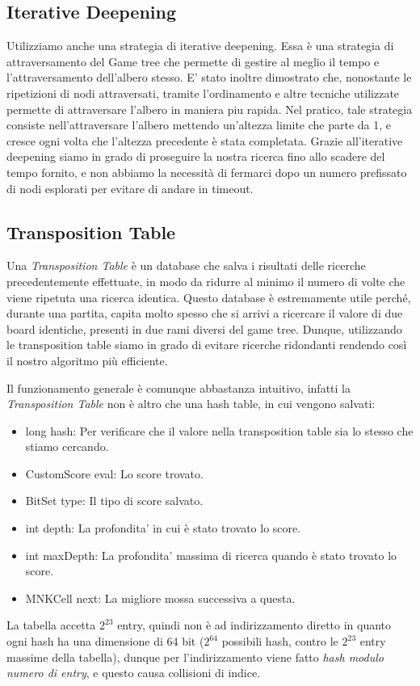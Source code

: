 \documentclass{article}
\begin{document}
\subsection{Iterative Deepening}
Utilizziamo anche una strategia di iterative deepening. Essa è una strategia di attraversamento del Game tree che permette di gestire al meglio il tempo e l'attraversamento dell'albero stesso. E' stato inoltre dimostrato che, nonostante le ripetizioni di nodi attraversati, tramite l'ordinamento e altre tecniche utilizzate permette di attraversare l'albero in maniera piu rapida. Nel pratico, tale strategia consiste nell'attraversare l'albero mettendo un'altezza limite che parte da 1, e cresce ogni volta che l'altezza precedente è stata completata. Grazie all'iterative deepening siamo in grado di proseguire la nostra ricerca fino allo scadere del tempo fornito, e non abbiamo la necessità di fermarci dopo un numero prefissato di nodi esplorati per evitare di andare in timeout.
\subsection{Transposition Table}
Una \textit{Transposition Table} è un database che salva i risultati delle ricerche precedentemente effettuate, in modo da ridurre al minimo il numero di volte che viene ripetuta una ricerca identica. Questo database è estremamente utile perché, durante una partita, capita molto spesso che si arrivi a ricercare il valore di due board identiche, presenti in due rami diversi del game tree. Dunque, utilizzando le transposition table siamo in grado di evitare ricerche ridondanti rendendo così il nostro algoritmo più efficiente.

Il funzionamento generale è comunque abbastanza intuitivo, infatti la \textit{Transposition Table} non è altro che una hash table, in cui vengono salvati: 
\begin{itemize}
\item long hash: Per verificare che il valore nella transposition table sia lo stesso che stiamo cercando.
\item CustomScore   eval:       Lo score trovato.
\item BitSet        type:       Il tipo di score salvato.
\item int           depth:      La profondita' in cui è stato trovato lo score.
\item int           maxDepth:   La profondita' massima di ricerca quando è stato trovato lo score.
\item MNKCell       next:       La migliore mossa successiva a questa.
\end{itemize}
La tabella accetta $2^{23}$ entry, quindi non è ad indirizzamento diretto in quanto ogni hash ha una dimensione di 64 bit ($2^{64}$ possibili hash, contro le $2^{23}$ entry massime della tabella), dunque per l'indirizzamento viene fatto \textit{hash modulo numero di entry}, e questo causa collisioni di indice.
\end{document}
